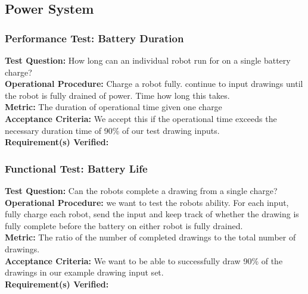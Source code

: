 
\subsection{Power System}
\label{sec:verification_power}

\subsubsection{Performance Test: Battery Duration}
\label{test:power_pt_battery}
\textbf{Test Question:} How long can an individual robot run for on a single battery charge? \\
\textbf{Operational Procedure:} Charge a robot fully.  continue to input drawings until the robot is fully drained of power. Time how long this takes. \\
\textbf{Metric:} The duration of operational time given one charge \\
\textbf{Acceptance Criteria:} We accept this if the operational time exceeds the necessary duration time of 90\% of our test drawing inputs. \\
\textbf{Requirement(s) Verified:} 

\subsubsection{Functional Test: Battery Life}
\label{test:power_ft_battery}
\textbf{Test Question:} Can the robots complete a drawing from a single charge? \\
\textbf{Operational Procedure:}  we want to test the robots ability. For each input, fully charge each robot, send the input and keep track of whether the drawing is fully complete before the battery on either robot is fully drained. \\
\textbf{Metric:} The ratio of the number of completed drawings to the total number of drawings. \\
\textbf{Acceptance Criteria:}  We want to be able to successfully draw 90\% of the drawings in our example drawing input set. \\
\textbf{Requirement(s) Verified:}  \\


